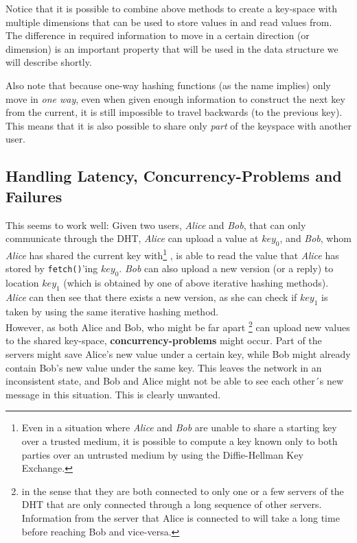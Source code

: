 \documentclass[a4paper]{article}
\begin{document}
Notice that it is possible to combine above methods to create a key-space with multiple dimensions that can be used to store values in and read values from. The difference in required information to move in a certain direction (or dimension) is an important property that will be used in the data structure we will describe shortly.

Also note that because one-way hashing functions (as the name implies) only move in \textit{one way}, even when given enough information to construct the next key from the current, it is still impossible to travel backwards (to the previous key). This means that it is also possible to share only \textit{part} of the keyspace with another user.\\


\subsection{Handling Latency, Concurrency-Problems and Failures}

This seems to work well: Given two users, \textit{Alice} and \textit{Bob}, that can only communicate through the DHT, \textit{Alice} can upload a value at $key_0$, and \textit{Bob}, whom \textit{Alice} has shared the current key with\footnote{Even in a situation where \textit{Alice} and \textit{Bob} are unable to share a starting key over a trusted medium, it is possible to compute a key known only to both parties over an untrusted medium by using the Diffie-Hellman Key Exchange. } , is able to read the value that \textit{Alice} has stored by \texttt{fetch()}'ing $key_0$. \textit{Bob} can also upload a new version (or a reply) to location $key_1$ (which is obtained by one of above iterative hashing methods). \textit{Alice} can then see that there exists a new version, as she can check if $key_1$ is taken by using the same iterative hashing method. \\

However, as both Alice and Bob, who might be far apart \footnote{in the sense that they are both connected to only one or a few servers of the DHT that are only connected through a long sequence of other servers. Information from the server that Alice is connected to will take a long time before reaching Bob and vice-versa.} can upload new values to the shared key-space, \textbf{concurrency-problems} might occur. Part of the servers might save Alice's new value under a certain key, while Bob might already contain Bob's new value under the same key. This leaves the network in an inconsistent state, and Bob and Alice might not be able to see each other´s new message in this situation. This is clearly unwanted.\\
\end{document}
